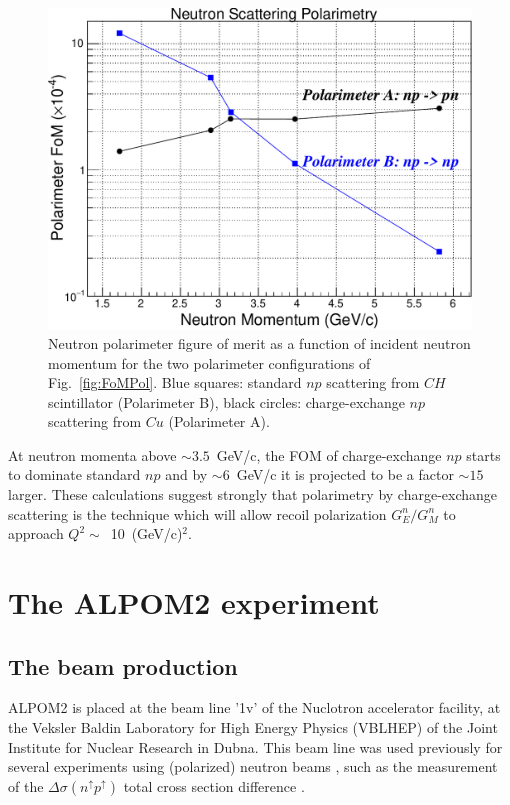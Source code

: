 \documentclass[twocolumn,epjc3]{svjour3}
\begin{document}
\begin{figure}
  \centering
  \includegraphics[width=1.00\columnwidth]{fig06_NeutronFoM1.pdf}
  \caption{Neutron polarimeter figure of merit as a function of incident neutron momentum for the two polarimeter configurations of Fig.~\ref{fig:FoMPol}.  Blue squares: standard $np$ scattering from $CH$ scintillator (Polarimeter B), black circles: charge-exchange $np$ scattering from $Cu$ (Polarimeter A).}
  \label{fig:FoM}
\end{figure}

At neutron momenta above $\sim3.5$~GeV/c, the FOM of charge-exchange $np$ starts to dominate standard $np$ and by $\sim 6$~GeV/c it is projected to be a factor $\sim 15$ larger. These calculations suggest strongly that polarimetry by charge-exchange scattering is the technique which will allow recoil polarization $G^n_E/G^n_M$ to approach $Q^2 \sim$~10~(GeV/c)$^2$.

\section{The ALPOM2 experiment}
\subsection{The beam production}
ALPOM2 is placed at the beam line '1v' of the Nuclotron accelerator facility, at the Veksler Baldin Laboratory for High Energy Physics (VBLHEP) of the Joint Institute for Nuclear Research in Dubna. This beam line was used previously for several experiments using (polarized) neutron beams \cite{Kirillov:1996zf}, such as the measurement of the $\Delta\sigma(n^\uparrow p^\uparrow)$ total cross section difference \cite{Sharov:2004pg}.
\end{document}
